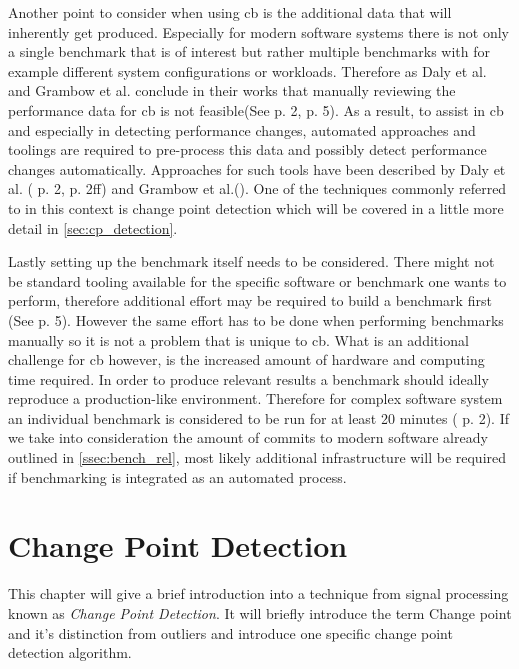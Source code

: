 \documentclass[	runningheads,
				a4paper]{llncs}
\begin{document}
	Another point to consider when using \gls{cb} is the additional data that will inherently get produced. Especially for modern software systems there is not only a single benchmark that is of interest but rather multiple benchmarks with for example different system configurations or workloads. Therefore as Daly et al. and Grambow et al. conclude in their works that manually reviewing the performance data for \gls{cb} is not feasible(See \cite{daly2020} p. 2, \cite{grambow2019} p. 5). As a result, to assist in \gls{cb} and especially in detecting performance changes, automated approaches and toolings are required to pre-process this data and possibly detect performance changes automatically. Approaches for such tools have been described by Daly et al. (\cite{daly2020} p. 2, \cite{daly2021} p. 2ff) and Grambow et al.(\cite{grambow2019}). One of the techniques commonly referred to in this context is change point detection which will be covered in a little more detail in \autoref{sec:cp_detection}.

	Lastly setting up the benchmark itself needs to be considered. There might not be standard tooling available for the specific software or benchmark one wants to perform, therefore additional effort may be required to build a benchmark first (See \cite{grambow2019} p. 5). However the same effort has to be done when performing benchmarks manually so it is not a problem that is unique to \gls{cb}. What is an additional challenge for \gls{cb} however, is the increased amount of hardware and computing time required. In order to produce relevant results a benchmark should ideally reproduce a production-like environment. Therefore for complex software system an individual benchmark is considered to be run for at least 20 minutes (\cite{grambow2019} p. 2). If we take into consideration the amount of commits to modern software already outlined in \autoref{ssec:bench_rel}, most likely additional infrastructure will be required if benchmarking is integrated as an automated process. 

	\section{Change Point Detection}
	\label{sec:cp_detection}
	This chapter will give a brief introduction into a technique from signal processing known as \textit{Change Point Detection}. It will briefly introduce the term Change point and it's distinction from outliers and introduce one specific change point detection algorithm. 
	
\end{document}
